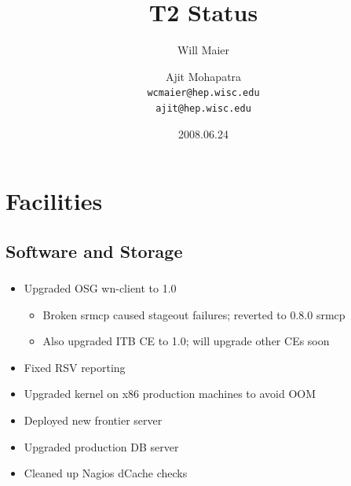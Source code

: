 \documentclass{beamer}
\title{T2 Status}
\author[Maier, Mohapatra]{
    Will Maier \and Ajit Mohapatra\\ 
    {\tt wcmaier@hep.wisc.edu}\\
    {\tt ajit@hep.wisc.edu}}
\institute[Wisconsin]{University of Wisconsin - High Energy Physics}
\date{2008.06.24}
\begin{document}
\begin{frame}
    \titlepage
\end{frame}


\section{Facilities}
\subsection{Software and Storage}
\begin{frame}
\frametitle{}
\begin{itemize}
    \item Upgraded OSG wn-client to 1.0
    \begin{itemize}
        \item Broken srmcp caused stageout failures; reverted to 0.8.0 srmcp
        \item Also upgraded ITB CE to 1.0; will upgrade other CEs soon
    \end{itemize}
    \item Fixed RSV reporting
    \item Upgraded kernel on x86 production machines to avoid OOM
    \item Deployed new frontier server
    \item Upgraded production DB server
    \item Cleaned up Nagios dCache checks
\end{itemize}
\end{frame}
\end{document}
